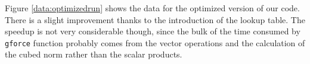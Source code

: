 \documentclass[11pt,letterpaper]{article}
\begin{document}
Figure \ref{data:optimizedrun} shows the data for the optimized version of our
code. There is a slight improvement thanks to the introduction of the lookup
table. The speedup is not very considerable though, since the bulk of the time
consumed by \texttt{gforce} function probably comes from the vector operations
and the calculation of the cubed norm rather than the scalar products.
\end{document}
